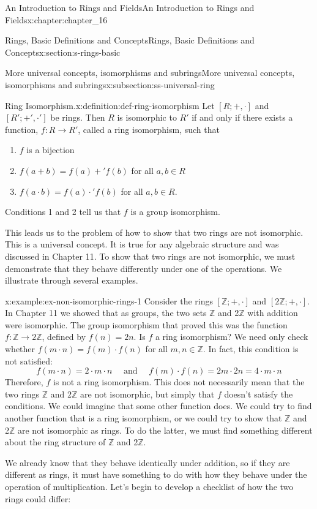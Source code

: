 \documentclass[twoside,10pt,]{book}
\numberwithin{equation}{section}
\begin{document}
\begin{chapterptx}{An Introduction to Rings and Fields}{}{An Introduction to Rings and Fields}{}{}{x:chapter:chapter_16}
\begin{sectionptx}{Rings, Basic Definitions and Concepts}{}{Rings, Basic Definitions and Concepts}{}{}{x:section:s-rings-basic}
\begin{subsectionptx}{More universal concepts, isomorphisms and subrings}{}{More universal concepts, isomorphisms and subrings}{}{}{x:subsection:ss-universal-ring}
\begin{definition}{Ring Isomorphism.}{x:definition:def-ring-isomorphism}
%
\label{g:notation:idm404591583744}%
Let \([R; + , \cdot ]\) and \([R'; +', \cdot']\) be rings. Then  \(R\) is isomorphic to   \(R'\) if and only if there exists a function, \(f:R \to  R'\), called a ring isomorphism, such that%
\begin{enumerate}[label=(\arabic*)]
\item{}\(f\) is a bijection%
\item{}\(f(a + b) =f(a)+'f(b)\) for all \(a, b \in  R\)%
\item{}\(f(a \cdot  b) = f(a)\cdot ' f(b)\)  for all \(a,b \in  R\).%
\end{enumerate}
%
\end{definition}
Conditions 1 and 2 tell us that \(f\) is a group isomorphism.%
\par
This leads us to the problem of how to show that two rings are not isomorphic. This is a universal concept. It is true for any algebraic structure and was discussed in Chapter 11. To show that two rings are not isomorphic, we must demonstrate that they behave differently under one of the operations. We illustrate through several examples.%
\begin{example}{}{x:example:ex-non-isomorphic-rings-1}%
Consider the rings \([\mathbb{Z}; +, \cdot ]\) and \([2\mathbb{Z}; +, \cdot ]\). In Chapter 11 we showed that as groups, the two sets \(\mathbb{Z}\) and 2\(\mathbb{Z}\) with addition were isomorphic. The group isomorphism that proved this was the function \(f : \mathbb{Z} \to 2\mathbb{Z}\), defined by \(f(n) = 2n\).  Is \(f\) a ring isomorphism? We need only check whether \(f(m\cdot n) = f(m)\cdot f(n)\) for all \(m, n \in \mathbb{Z}\).  In fact, this condition is not satisfied:%
\begin{equation*}
f(m\cdot n) = 2\cdot m\cdot n \quad\textrm{ and }\quad
f(m)\cdot f(n)=2m\cdot 2n= 4\cdot m \cdot n
\end{equation*}
Therefore,  \(f\) is not a ring isomorphism. This does not necessarily mean that the two rings \(\mathbb{Z}\) and 2\(\mathbb{Z}\) are not isomorphic, but simply that \(f\) doesn't satisfy the conditions.  We could imagine that some other function does. We could  try to find another function that is a ring isomorphism, or we could try to show that \(\mathbb{Z}\) and 2\(\mathbb{Z}\) are not isomorphic as rings. To do the latter, we must find something different about the ring structure of \(\mathbb{Z}\) and 2\(\mathbb{Z}\).%
\par
We already know that they behave identically under addition, so if they are different as rings, it must have something to do with how they behave under the operation of multiplication. Let's begin to develop a checklist of how the two rings could differ:%

\end{example}
\end{subsectionptx}
\end{sectionptx}
\end{chapterptx}
\end{document}
